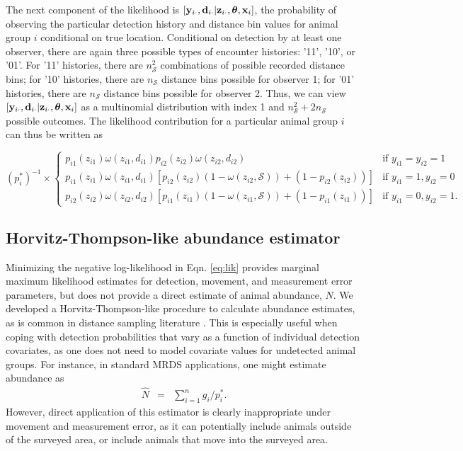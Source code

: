 \documentclass[aoas,preprint]{imsart}
\numberwithin{equation}{section}
\theoremstyle{plain}
\begin{document}
The next component of the likelihood is $[{\bf y}_{i \cdot},{\bf d}_{i \cdot}|{\bf z}_{i \cdot} , \boldsymbol{\theta} , {\bf x}_i]$, the probability of observing the particular detection history and distance bin values for animal group $i$ conditional on true location.  Conditional on detection by at least one observer, there are again three possible types of encounter histories: '11', '10', or '01'.  For '11' histories, there are $n_\mathcal{S}^2$ combinations of possible recorded distance bins; for '10' histories, there are $n_\mathcal{S}$ distance bins possible for observer 1; for '01' histories, there are $n_\mathcal{S}$ distance bins possible for observer 2.  Thus, we can view $[{\bf y}_{i \cdot},{\bf d}_{i \cdot}|{\bf z}_{i \cdot} , \boldsymbol{\theta} , {\bf x}_i]$ as a multinomial distribution with index 1 and $n_\mathcal{S}^2 + 2 n_\mathcal{S}$ possible outcomes. The likelihood contribution for a particular animal group $i$ can thus be written as
\begin{linenomath}
\begin{equation*}
    \label{eq:obsmod}
    (p_i^*)^{-1} \times  \left\{ \begin{array}{rl}
    p_{i1}(z_{i1}) \omega(z_{i1},d_{i1}) p_{i2}(z_{i2}) \omega(z_{i2},d_{i2}) & \text{if }y_{i1}=y_{i2}=1 \\
    p_{i1}(z_{i1})\omega(z_{i1},d_{i1}) \left[
    p_{i2}(z_{i2})(1-\omega(z_{i2},\mathcal{S}))+(1-p_{i2}(z_{i2})) \right] &  \text{if } y_{i1}=1, y_{i2}=0 \\
    p_{i2}(z_{i2})\omega(z_{i2},d_{i2}) \left[
    p_{i1}(z_{i1})(1-\omega(z_{i1},\mathcal{S}))+(1-p_{i1}(z_{i1})) \right]
                                     &  \text{if } y_{i1}=0, y_{i2}=1.
                                    \end{array} \right.
\end{equation*}
\end{linenomath}

\subsection{Horvitz-Thompson-like abundance estimator}

Minimizing the negative log-likelihood in Eqn. \ref{eq:lik} provides marginal maximum likelihood estimates for detection, movement, and measurement error parameters, but does not provide a direct estimate of animal abundance, $N$.  We developed a Horvitz-Thompson-like procedure to calculate abundance estimates, as is common in distance sampling literature \citep[see e.g.][]{BucklandEtAl2004}.  This is especially useful when coping with detection probabilities that vary as a function of individual detection covariates, as one does not need to model covariate values for undetected animal groups.  For instance, in standard MRDS applications, one might estimate abundance as
\begin{eqnarray*}
  \hat{N} & = & \sum_{i=1}^n g_i / p_i^*.
\end{eqnarray*}
However, direct application of this estimator is clearly inappropriate under movement and measurement error, as it can potentially include animals outside of the surveyed area, or include animals that move into the surveyed area.
\end{document}
